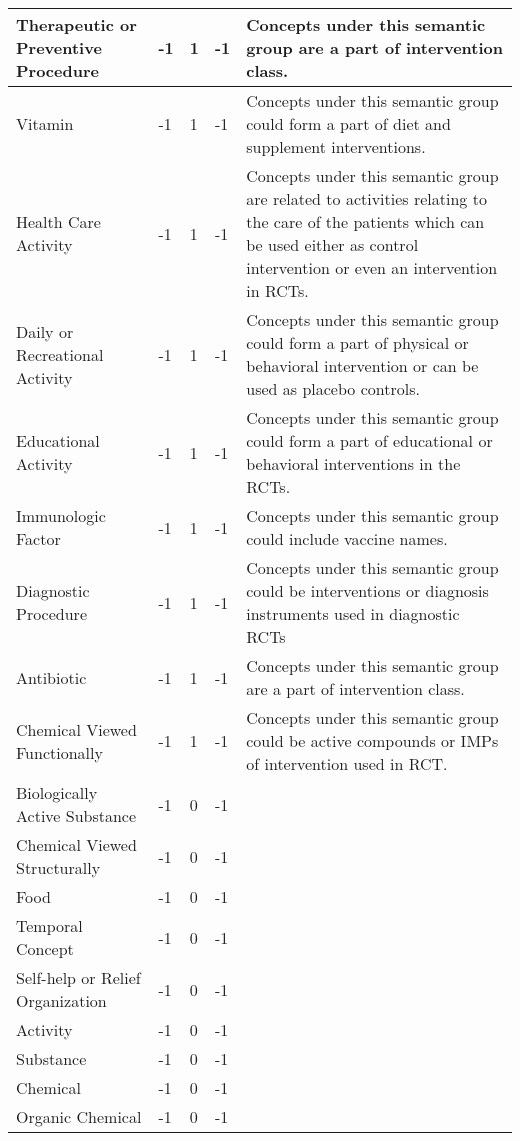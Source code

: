 \documentclass[10.7pt,]{article}
\begin{document}
\begin{longtable}{|l|p{0.3cm}|p{0.3cm}|p{0.3cm}|p{7.9cm}|}
        Therapeutic or Preventive Procedure & -1 & 1 & -1 & Concepts under this semantic group are a part of intervention class. \\ \hline
        Vitamin & -1 & 1 & -1 & Concepts under this semantic group could form a part of diet and supplement interventions. \\ \hline
        Health Care Activity & -1 & 1 & -1 & Concepts under this semantic group are related to activities relating to the care of the patients which can be used either as control intervention or even an intervention in RCTs. \\ \hline
        Daily or Recreational Activity & -1 & 1 & -1 & Concepts under this semantic group could form a part of physical or behavioral intervention or can be used as placebo controls. \\ \hline
        Educational Activity & -1 & 1 & -1 & Concepts under this semantic group could form a part of educational or behavioral interventions in the RCTs. \\ \hline
        Immunologic Factor & -1 & 1 & -1 & Concepts under this semantic group could include vaccine names. \\ \hline
        Diagnostic Procedure & -1 & 1 & -1 & Concepts under this semantic group could be interventions or diagnosis instruments used in diagnostic RCTs \\ \hline
        Antibiotic & -1 & 1 & -1 & Concepts under this semantic group are a part of intervention class. \\ \hline
        Chemical Viewed Functionally & -1 & 1 & -1 & Concepts under this semantic group could be active compounds or IMPs of intervention used in RCT. \\ \hline
        Biologically Active Substance & -1 & 0 & -1 & ~ \\ \hline
        Chemical Viewed Structurally & -1 & 0 & -1 & ~ \\ \hline
        Food & -1 & 0 & -1 & ~ \\ \hline
        Temporal Concept & -1 & 0 & -1 & ~ \\ \hline
        Self-help or Relief Organization & -1 & 0 & -1 & ~ \\ \hline
        Activity & -1 & 0 & -1 & ~ \\ \hline
        Substance & -1 & 0 & -1 & ~ \\ \hline
        Chemical & -1 & 0 & -1 & ~ \\ \hline
        Organic Chemical & -1 & 0 & -1 & ~ \\ \hline

\end{longtable}
\end{document}
